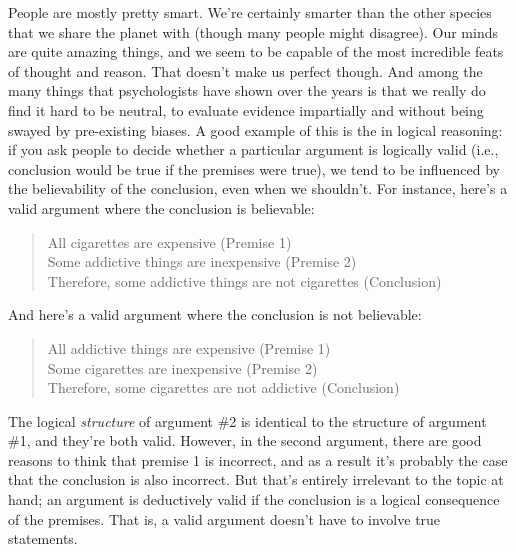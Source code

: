 
People are mostly pretty smart. We're certainly smarter than the other species that we share the planet with (though many people might disagree). Our minds are quite amazing things, and we seem to be capable of the most incredible feats of thought and reason. That doesn't make us perfect though. And among the many things that psychologists have shown over the years is that we really do find it hard to be neutral, to evaluate evidence impartially and without being swayed by pre-existing biases. A good example of this is the  in logical reasoning: if you ask people to decide whether a particular argument is logically valid (i.e., conclusion would be true if the premises were true), we tend to be influenced by the believability of the conclusion, even when we shouldn't. For instance, here's a valid argument where the conclusion is believable:
\begin{quote}
All cigarettes are expensive (Premise 1) \\
Some addictive things are inexpensive (Premise 2)\\
Therefore, some addictive things are not cigarettes (Conclusion)
\end{quote}
And here's a valid argument where the conclusion is not believable:
\begin{quote}
All addictive things are expensive (Premise 1)\\
Some cigarettes are inexpensive (Premise 2)\\
Therefore, some cigarettes are not addictive (Conclusion)
\end{quote}
The logical {\it structure} of argument \#2 is identical to the structure of argument \#1, and they're both valid. However, in the second argument, there are good reasons to think that premise 1 is incorrect, and as a result it's probably the case that the conclusion is also incorrect. But that's entirely irrelevant to the topic at hand; an argument is deductively valid if the conclusion is a logical consequence of the premises. That is, a valid argument doesn't have to involve true statements.

